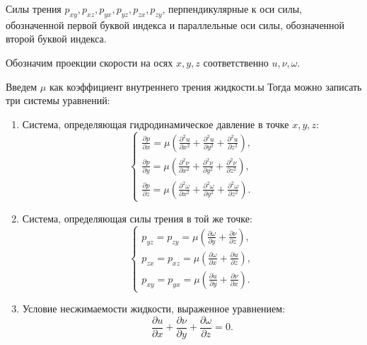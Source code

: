 \documentclass[a4paper,14pt]{extarticle}
\begin{document}
Силы трения $p_{xy}, p_{xz}, p_{yx}, p_{yz}, p_{zx}, p_{zy}$, перпендикулярные к оси силы, обозначенной первой буквой индекса и параллельные оси силы, обозначенной второй буквой индекса.

Обозначим проекции скорости на осях $x, y, z \text{ соответственно}$ $u, \nu, \omega$.

Введем $\mu$ как коэффициент внутреннего трения жидкости.ы
 Тогда можно записать три системы уравнений:
\begin{enumerate}
	\item Система, определяющая гидродинамическое давление в
	точке $x, y, z$:
	\begin{equation}
		\label{eqfi}
		\begin{cases}
			\frac{\partial p}{\partial x} = \mu \left( \frac{\partial^2 u}{\partial x^2} + \frac{\partial^2 u}{\partial y^2} + \frac{\partial^2 u}{\partial z^2} \right), \\
				\frac{\partial p}{\partial y} = \mu \left( \frac{\partial^2 \nu}{\partial x^2} + \frac{\partial^2 \nu}{\partial y^2} + \frac{\partial^2 \nu}{\partial z^2} \right), \\
					\frac{\partial p}{\partial z} = \mu \left( \frac{\partial^2 \omega}{\partial x^2} + \frac{\partial^2 \omega}{\partial y^2} + \frac{\partial^2 \omega}{\partial z^2} \right).
		\end{cases}
	\end{equation}
\item Система, определяющая силы трения в той же точке:
\begin{equation}
	\label{eqsi}
	\begin{cases}
		p_{yz} = p_{zy} = \mu \left(\frac{\partial \omega}{\partial y} + \frac{\partial \nu}{\partial z} \right), \\
			p_{zx} = p_{xz} = \mu \left( \frac{\partial \omega}{\partial x} +  \frac{\partial u}{\partial z} \right), \\
				p_{xy} = p_{yx} = \mu \left(  \frac{\partial u}{\partial y} + \frac{\partial \nu}{\partial x} \right).
	\end{cases}
\end{equation}
\item Условие несжимаемости жидкости, выраженное уравнением: 
\begin{equation}
	\label{eqthi}
	\frac{\partial u}{\partial x} + \frac{\partial \nu}{\partial y} + \frac{\partial \omega}{\partial z} = 0.
	\end{equation}

\end{enumerate}
\end{document}
